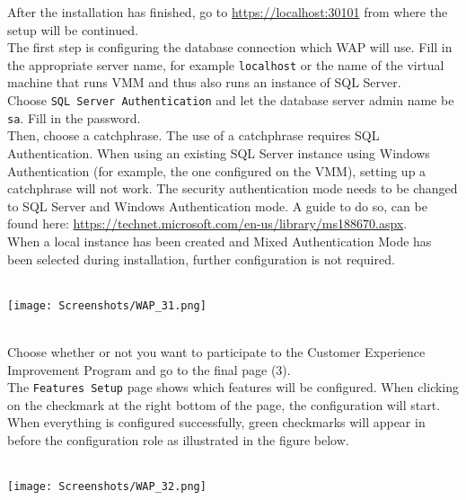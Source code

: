 \clearpage
After the installation has finished, go to \url{https://localhost:30101} from where the setup will be continued. \\
The first step is configuring the database connection which WAP will use. Fill in the appropriate server name, for example \texttt{localhost} or the name of the virtual machine that runs VMM and thus also runs an instance of SQL Server. \\
Choose \texttt{SQL Server Authentication} and let the database server admin name be \texttt{sa}. Fill in the password. \\
Then, choose a catchphrase. The use of a catchphrase requires SQL Authentication. When using an existing SQL Server instance using Windows Authentication (for example, the one configured on the VMM), setting up a catchphrase will not work. The security authentication mode needs to be changed to SQL Server and Windows Authentication mode. A guide to do so, can be found here: \url{https://technet.microsoft.com/en-us/library/ms188670.aspx}. \\
When a local instance has been created and Mixed Authentication Mode has been selected during installation, further configuration is not required.
$\;$ \\ \\
\noindent\begin{minipage}{\textwidth}
    \centering
    \texttt{[image: Screenshots/WAP\_31.png]}
\end{minipage}
$\;$ \\ \\
Choose whether or not you want to participate to the Customer Experience Improvement Program and go to the final page (3). \\
The \texttt{Features Setup} page shows which features will be configured. When clicking on the checkmark at the right bottom of the page, the configuration will start. When everything is configured successfully, green checkmarks will appear in before the configuration role as illustrated in the figure below.
$\;$ \\ \\
\noindent\begin{minipage}{\textwidth}
    \centering
    \texttt{[image: Screenshots/WAP\_32.png]}
\end{minipage}

\clearpage

